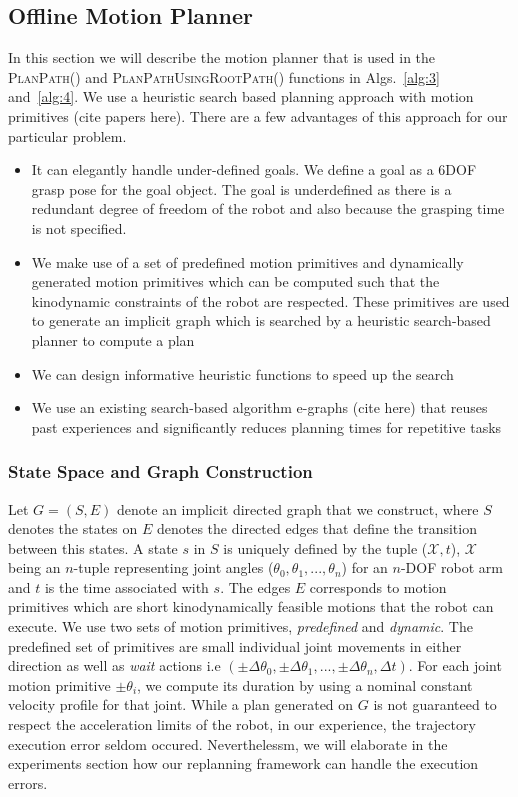 {\subsection{Offline Motion Planner}
In this section we will describe the motion planner that is used in the \textsc{PlanPath()} and \textsc{PlanPathUsingRootPath()} functions in Algs.~\ref{alg:3} and~\ref{alg:4}. We use a heuristic search based planning approach with motion primitives (cite papers here). There are a few advantages of this approach for our particular problem.
\begin{itemize}
    \item It can elegantly handle under-defined goals. We define a goal as a 6DOF grasp pose for the goal object. The goal is underdefined as there is a redundant degree of freedom of the robot and also because the grasping time is not specified.
    \item We make use of a set of predefined motion primitives and dynamically generated motion primitives which can be computed such that the kinodynamic constraints of the robot are respected. These primitives are used to generate an implicit graph which is searched by a heuristic search-based planner to compute a plan
    \item We can design informative heuristic functions to speed up the search
    \item We use an existing search-based algorithm e-graphs (cite here) that reuses past experiences and significantly reduces planning times for repetitive tasks
\end{itemize}


\subsubsection{State Space and Graph Construction}

Let $G = (S,E)$ denote an implicit directed graph that we construct, where $S$ denotes the states on $E$ denotes the directed edges that define the transition between this states. A state $s$ in $S$ is uniquely defined by the tuple ($\mathcal{X},t$), $\mathcal{X}$ being an $n$-tuple representing joint angles ($\theta_0, \theta_1, ..., \theta_n$) for an $n$-DOF robot arm and $t$ is the time associated with $s$.
The edges $E$ corresponds to motion primitives which are short kinodynamically feasible motions that the robot can execute. We use two sets of motion primitives, \textit{predefined} and \textit{dynamic}. The predefined set of primitives are small individual joint movements in either direction as well as \textit{wait} actions i.e $(\pm \Delta \theta_0, \pm \Delta \theta_1, ..., \pm \Delta \theta_n, \Delta t)$. For each joint motion primitive $\pm \theta_i$, we compute its duration by using a nominal constant velocity profile for that joint. While a plan generated on $G$ is not guaranteed to respect the acceleration limits of the robot, in our experience, the trajectory execution error seldom occured. Neverthelessm, we will elaborate in the experiments section how our replanning framework can handle the execution errors.

}

